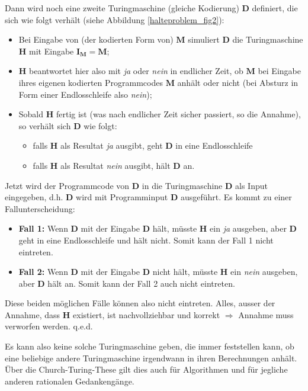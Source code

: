 Dann wird noch eine zweite Turingmaschine (gleiche Kodierung) $\mathbf{D}$ definiert, die sich wie folgt verhält (siehe Abbildung \ref{halteproblem_fig2}):
\begin{itemize}
  \item Bei Eingabe von (der kodierten Form von) $\mathbf{M}$ simuliert $\mathbf{D}$  die Turingmaschine $\mathbf{H}$ mit Eingabe $\mathbf{I_M = M}$;
  \item $\mathbf{H}$ beantwortet hier also mit \emph{ja} oder \emph{nein} in endlicher Zeit, ob $\mathbf{M}$ bei Eingabe ihres eigenen kodierten Programmcodes $\mathbf{M}$ anhält oder nicht (bei Absturz in Form einer Endlosschleife also \emph{nein});
  \item Sobald $\mathbf{H}$ fertig ist (was nach endlicher Zeit sicher passiert, so die Annahme), so verhält sich $\mathbf{D}$ wie folgt:
    \begin{itemize}
      \item falls $\mathbf{H}$ als Resultat \emph{ja} ausgibt, geht $\mathbf{D}$ in eine Endlosschleife
      \item falls $\mathbf{H}$ als Resultat \emph{nein} ausgibt, hält $\mathbf{D}$  an.
    \end{itemize}
\end{itemize}


Jetzt wird der Programmcode von $\mathbf{D}$ in die Turingmaschine $\mathbf{D}$ als Input eingegeben, d.h. $\mathbf{D}$ wird mit Programminput $\mathbf{D}$ ausgeführt. Es kommt zu einer Fallunterscheidung:
\begin{itemize}
  \item {\bf Fall 1:} Wenn $\mathbf{D}$ mit der Eingabe $\mathbf{D}$ hält, müsste $\mathbf{H}$ ein \emph{ja} ausgeben, aber $\mathbf{D}$ geht in eine Endlosschleife und hält nicht. Somit kann der Fall 1 nicht eintreten.
  \item {\bf Fall 2:} Wenn $\mathbf{D}$ mit der Eingabe $\mathbf{D}$ nicht hält, müsste $\mathbf{H}$ ein \emph{nein} ausgeben, aber $\mathbf{D}$ hält an. Somit kann der Fall 2 auch nicht eintreten.
\end{itemize}

Diese beiden möglichen Fälle können also nicht eintreten. Alles, ausser der Annahme, dass $\mathbf{H}$ existiert, ist nachvollziehbar und korrekt $\Rightarrow$ Annahme muss verworfen werden. q.e.d.\newline

Es kann also keine solche Turingmaschine geben, die immer feststellen kann, ob eine beliebige andere Turingmaschine irgendwann in ihren Berechnungen anhält. Über die Church-Turing-These gilt dies auch für Algorithmen und für jegliche anderen rationalen Gedankengänge.


